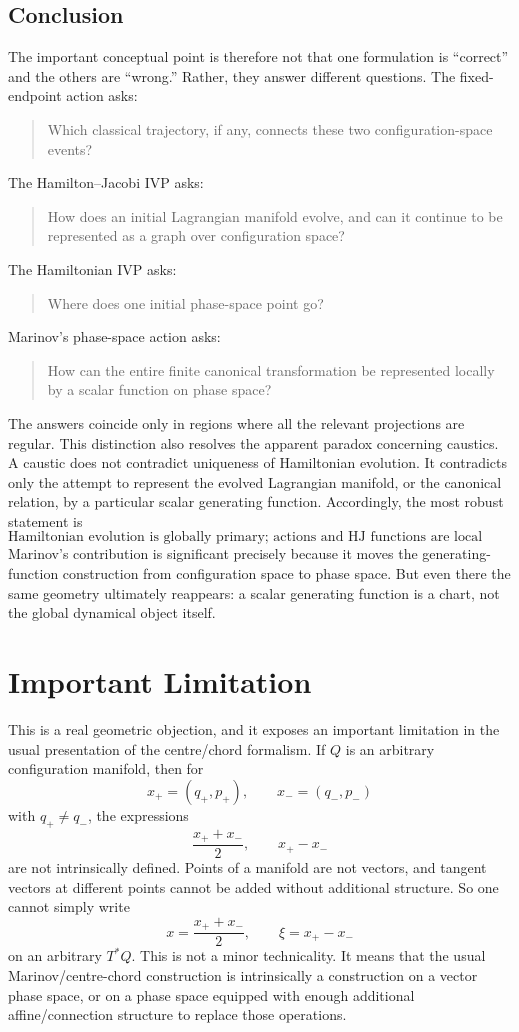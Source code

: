 \subsection{Conclusion}
The important conceptual point is therefore not that one formulation is
``correct'' and the others are ``wrong.''  Rather, they answer different
questions.
The fixed-endpoint action asks:
\begin{quote}
Which classical trajectory, if any, connects these two configuration-space
events?
\end{quote}
The Hamilton--Jacobi IVP asks:
\begin{quote}
How does an initial Lagrangian manifold evolve, and can it continue to be
represented as a graph over configuration space?
\end{quote}
The Hamiltonian IVP asks:
\begin{quote}
Where does one initial phase-space point go?
\end{quote}
Marinov's phase-space action asks:
\begin{quote}
How can the entire finite canonical transformation be represented locally by
a scalar function on phase space?
\end{quote}
The answers coincide only in regions where all the relevant projections are
regular.
This distinction also resolves the apparent paradox concerning caustics.
A caustic does not contradict uniqueness of Hamiltonian evolution.  It
contradicts only the attempt to represent the evolved Lagrangian manifold,
or the canonical relation, by a particular scalar generating function.
Accordingly, the most robust statement is
\begin{equation}
\boxed{
\text{Hamiltonian evolution is globally primary;
actions and HJ functions are local representations of that evolution.}
}
\end{equation}
Marinov's contribution is significant precisely because it moves the
generating-function construction from configuration space to phase space.
But even there the same geometry ultimately reappears: a scalar generating
function is a chart, not the global dynamical object itself.

\section{Important Limitation}
This is a real geometric objection, and it exposes an important limitation in
the usual presentation of the centre/chord formalism.
If \(Q\) is an arbitrary configuration manifold, then for
$$ x_+=(q_+,p_+),\qquad x_-=(q_-,p_-) $$
with \(q_+\neq q_-\), the expressions
$$ \frac{x_++x_-}{2},\qquad x_+-x_- $$
are not intrinsically defined. Points of a manifold are not vectors, and
tangent vectors at different points cannot be added without additional
structure.
So one cannot simply write
$$ x=\frac{x_++x_-}{2},\qquad \xi=x_+-x_- $$
on an arbitrary \(T^*Q\).
This is not a minor technicality. It means that the usual Marinov/centre-chord
construction is intrinsically a construction on a vector phase space, or on a
phase space equipped with enough additional affine/connection structure to
replace those operations.

